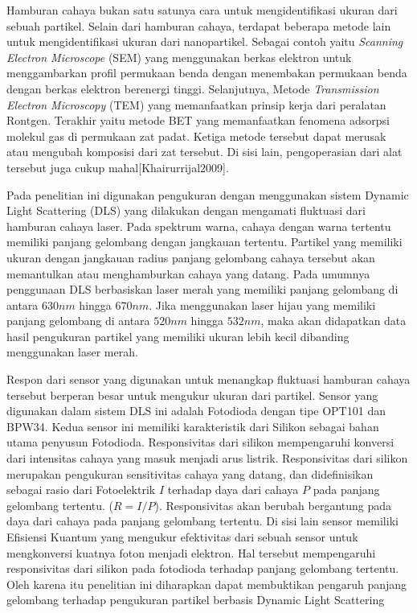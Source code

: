 Hamburan cahaya bukan satu satunya cara untuk mengidentifikasi ukuran dari sebuah partikel. Selain
dari hamburan cahaya, terdapat beberapa metode lain untuk mengidentifikasi ukuran dari nanopartikel.
Sebagai contoh yaitu \textit{Scanning Electron Microscope} (SEM) yang menggunakan berkas elektron
untuk menggambarkan profil permukaan benda dengan menembakan permukaan benda dengan berkas elektron
berenergi tinggi. Selanjutnya, Metode \textit{Transmission Electron Microscopy} (TEM) yang
memanfaatkan prinsip kerja dari peralatan Rontgen. Terakhir yaitu metode BET yang memanfaatkan
fenomena adsorpsi molekul gas di permukaan zat padat. Ketiga metode tersebut dapat merusak atau
mengubah komposisi dari zat tersebut. Di sisi lain, pengoperasian dari alat tersebut juga cukup
mahal[Khairurrijal2009].

Pada penelitian ini digunakan pengukuran dengan menggunakan sistem Dynamic Light Scattering (DLS)
yang dilakukan dengan mengamati fluktuasi dari hamburan cahaya laser. Pada spektrum warna, cahaya
dengan warna tertentu memiliki panjang gelombang dengan jangkauan tertentu. Partikel yang memiliki
ukuran dengan jangkauan radius panjang gelombang cahaya tersebut akan memantulkan atau menghamburkan
cahaya yang datang. Pada umumnya penggunaan DLS berbasiskan laser merah yang memiliki panjang
gelombang di antara ${630 nm}$ hingga ${670 nm}$. Jika menggunakan laser hijau yang memiliki panjang
gelombang di antara ${520 nm}$ hingga ${532 nm}$, maka akan didapatkan data hasil pengukuran
partikel yang memiliki ukuran lebih kecil dibanding menggunakan laser merah\cite{Black1996}. 

Respon dari sensor yang digunakan untuk menangkap fluktuasi hamburan cahaya tersebut berperan besar
untuk mengukur ukuran dari partikel. Sensor yang digunakan dalam sistem DLS ini adalah Fotodioda
dengan tipe OPT101 dan BPW34. Kedua sensor ini memiliki karakteristik dari Silikon sebagai bahan
utama penyusun Fotodioda. Responsivitas dari silikon mempengaruhi konversi dari intensitas cahaya
yang masuk menjadi arus listrik. Responsivitas dari silikon merupakan pengukuran sensitivitas cahaya
yang datang, dan didefinisikan sebagai rasio dari Fotoelektrik ${I}$ terhadap daya dari cahaya
${P}$ pada panjang gelombang tertentu. (${R = I/P}$). Responsivitas akan berubah bergantung pada
daya dari cahaya pada panjang gelombang tertentu. Di sisi lain sensor memiliki Efisiensi Kuantum
yang mengukur efektivitas dari sebuah sensor untuk mengkonversi kuatnya foton menjadi elektron.
Hal tersebut mempengaruhi responsivitas dari silikon pada fotodioda terhadap panjang gelombang
tertentu. Oleh karena itu penelitian ini diharapkan dapat membuktikan pengaruh panjang gelombang
terhadap pengukuran partikel berbasis Dynamic Light Scattering


